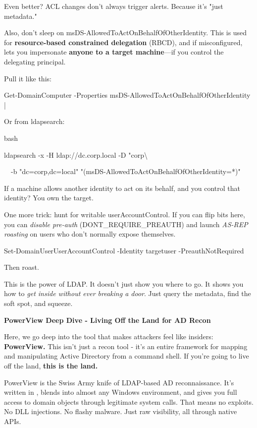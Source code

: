 Even better? ACL changes don’t always trigger alerts. Because it’s "just metadata."

Also, don’t sleep on msDS-AllowedToActOnBehalfOfOtherIdentity. This is used for \textbf{resource-based constrained delegation} (RBCD), and if misconfigured, lets you impersonate \textbf{anyone to a target machine}—if you control the delegating principal.

Pull it like this:

Get-DomainComputer -Properties msDS-AllowedToActOnBehalfOfOtherIdentity |


Or from ldapsearch:

bash

 

ldapsearch -x -H ldap://dc.corp.local -D "corp\textbackslash{}%

  -b "dc=corp,dc=local" "(msDS-AllowedToActOnBehalfOfOtherIdentity=*)"

If a machine allows another identity to act on its behalf, and you control that identity? You own the target.

One more trick: hunt for writable userAccountControl. If you can flip bits here, you can \textit{disable pre-auth} (DONT\_REQUIRE\_PREAUTH) and launch \textit{AS-REP roasting} on users who don’t normally expose themselves.

 

 

Set-DomainUserUserAccountControl -Identity targetuser -PreauthNotRequired

Then roast.

This is the power of LDAP. It doesn’t just show you where to go. It shows you how to \textit{get inside without ever breaking a door}. Just query the metadata, find the soft spot, and squeeze.

\textbf{PowerView Deep Dive - Living Off the Land for AD Recon}

Here, we go deep into the tool that makes attackers feel like insiders: \textbf{PowerView. }This isn’t just a recon tool - it’s an entire framework for mapping and manipulating Active Directory from a command shell. If you’re going to live off the land, \textbf{this is the land.}

PowerView is the Swiss Army knife of LDAP-based AD reconnaissance. It’s written in  , blends into almost any Windows environment, and gives you full access to domain objects through legitimate system calls. That means no exploits. No DLL injections. No flashy malware. Just raw visibility, all through native APIs.

